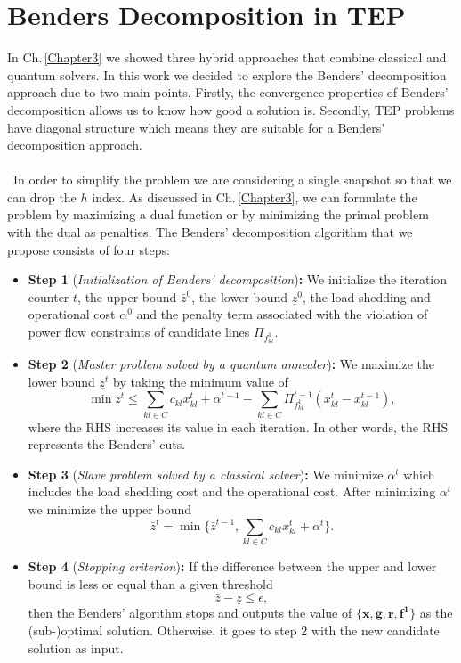 \section{Benders Decomposition in TEP}
In Ch.\,\ref{Chapter3} we showed three hybrid approaches that combine classical and quantum solvers. In this work we decided to explore the Benders' decomposition approach due to two main points. Firstly, the convergence properties of Benders' decomposition allows us to know how good a solution is. Secondly, TEP problems have diagonal structure which means they are suitable for a Benders' decomposition approach.\\\\\
In order to simplify the problem we are considering a single snapshot so that we can drop the $h$ index. As discussed in Ch.\,\ref{Chapter3}, we can formulate the problem by maximizing a dual function or by minimizing the primal problem with the dual as penalties. The Benders' decomposition algorithm that we propose consists of four steps:
\begin{itemize}
    \item \textbf{Step 1} (\textit{Initialization of Benders’ decomposition})\textbf{:} We initialize the iteration counter $t$, the upper bound $\bar{z}^{0}$, the lower bound $\underline{z}^{0}$, the load shedding and operational cost $\alpha^{0}$ and the penalty term associated with the violation of power flow constraints of candidate lines $\Pi_{f_{kl}^{1}}$.
    \item \textbf{Step 2} (\textit{Master problem solved by a quantum annealer})\textbf{:} We maximize the lower bound $\underline{z}^{t}$ by taking the minimum value of 
    \begin{equation}
      \min \underline{z}^{t} \leq \sum_{kl\in C}c_{kl}x_{kl}^{t} + \alpha^{t-1} - \sum_{kl\in C}\Pi^{t-1}_{f_{kl}^{1}}\left(x_{kl}^{t} - x_{kl}^{t-1}\right),  
    \end{equation}
    where the RHS increases its value in each iteration. In other words, the RHS represents the Benders' cuts.
    \item \textbf{Step 3} (\textit{Slave problem solved by a classical solver})\textbf{:} We minimize $\alpha^{t}$ which includes the load shedding cost and the operational cost. After minimizing $\alpha^{t}$ we minimize the upper bound
    \begin{equation}
        \bar{z}^{t} = \min \{\bar{z}^{t-1}, \sum_{kl \in C}c_{kl}x_{kl}^{t} + \alpha^{t}\}.
    \end{equation}
    \item \textbf{Step 4} (\textit{Stopping criterion})\textbf{:} If the difference between the upper and lower bound is less or equal than a given threshold
    \begin{equation}
        \bar{z} - \underline{z} \leq \epsilon,
    \end{equation}
    then the Benders' algorithm stops and outputs the value of $\{\mathbf{x},\mathbf{g},\mathbf{r},\mathbf{f^{1}}\}$ as the (sub-)optimal solution. Otherwise, it goes to step 2 with the new candidate solution as input.
\end{itemize}
